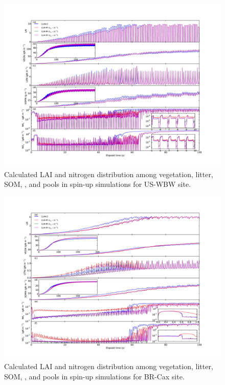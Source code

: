 \documentclass[gmd, manuscript]{copernicus}
\begin{document}
\begin{figure}[t]
\includegraphics[width=18cm]{../figs/fig11/pit300yl.pdf}
\caption{Calculated LAI and nitrogen distribution among vegetation, litter,
SOM, , and  pools in spin-up simulations for US-WBW
site.}
\label{fig:pit300yl}
\end{figure}

\begin{figure}[t]
\includegraphics[width=18cm]{../figs/fig12/cax300yl.pdf}
\caption{Calculated LAI and nitrogen distribution among vegetation, litter,
SOM, , and  pools in spin-up simulations for BR-Cax
site. }
\label{fig:cax300yl}
\end{figure}
\end{document}
